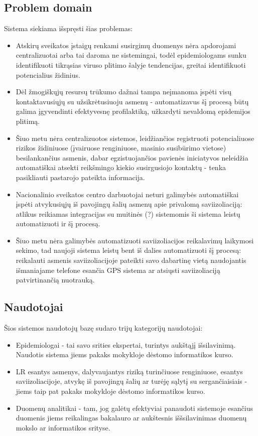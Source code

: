 \documentclass{VUMIFPSkursinis}
\begin{document}
\subsection{Problem domain}
Sistema siekiama išspręsti šias problemas:
\begin{itemize}
	\item Atskirų sveikatos įstaigų renkami susirgimų duomenys nėra apdorojami centralizuotai
	      arba tai daroma ne sistemingai, todėl epidemiologams sunku identifikuoti tikrąsias viruso
	      plitimo šalyje tendencijas, greitai identifikuoti potencialius židinius.
	\item Dėl žmogiškųjų resursų trūkumo dažnai tampa neįmanoma įspėti visų kontaktavusiųjų
	      su užsikrėtusiuoju asmenų - automatizavus šį procesą būtų galima įgyvendinti efektyvesnę
	      profilaktiką, užkardyti nevaldomą epidemijos plitimą.
	\item Šiuo metu nėra centralizuotos sistemos, leidžiančios registruoti potencialiuose
	      rizikos židiniuose (įvairuose renginiuose, masinio susibūrimo vietose) besilankančius
	      asmenis, dabar egzistuojančios pavienės iniciatyvos neleidžia automatiškai atsekti reikšmingo kiekio susirgusiojo kontaktų - tenka pasikliauti pastarojo pateikta informacija.
	\item Nacionalinio sveikatos centro darbuotojai neturi galimybės automatiškai įspėti
	      atvykusiųjų iš pavojingų šalių asmenų apie privalomą saviizoliaciją: atlikus reikiamas
	      integracijas su {\color{red}muitinės (?)} sistemomis ši sistema leistų automatizuoti ir šį procesą.
	\item Šiuo metu nėra galimybės automatizuoti saviizoliacijos reikalavimų laikymosi sekimo,
	      tad naujoji sistema leistų bent iš dalies automatizuoti šį procesą: reikalauti asmenis
	      saviizoliacijoje pateikti savo dabartinę vietą naudojantis išmaniajame telefone esančia
	      GPS sistema ar atsiųsti saviizoliaciją patvirtinančią nuotrauką.
\end{itemize}

\subsection{Naudotojai}
Šios sistemos naudotojų bazę sudaro trijų kategorijų naudotojai:
\begin{itemize}
	\item Epidemiologai - tai savo srities ekspertai, turintys aukštąjį išsilavinimą.
	      Naudotis sistema jiems pakaks mokykloje dėstomo informatikos kurso.
	\item LR esantys asmenys, dalyvaujantys riziką turinčiuose renginiuose, esantys saviizoliacijoje,
	      atvykę iš pavojingų šalių ar turėję sąlytį su sergančiaisiais - jiems taip pat pakaks
	      mokykloje dėstomo informatikos kurso.
	\item Duomenų analitikai - tam, jog galėtų efektyviai panaudoti sistemoje
	      esančius duomenis jiems reikalingas bakalauro ar aukštesnis iššsilavinimas
	      duomenų mokslo ar informatikos srityse.
\end{itemize}
\end{document}
